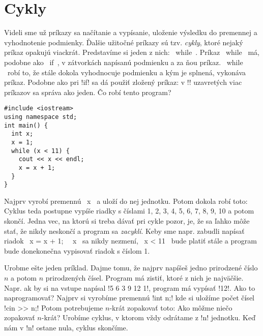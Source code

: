 \chapter{Cykly}

Videli sme už príkazy sa načítanie a vypísanie, uloženie výsledku do premennej
a vyhodnotenie podmienky. Ďalšie užitočné príkazy sú tzv. {\em cykly}, ktoré
nejaký príkaz opakujú viackrát. Predstavíme si jeden z nich: \prg~while~.
Príkaz \prg~while~ má, podobne ako \prg~if~, v zátvorkách napísanú
podmienku a za ňou príkaz. \prg ~while ~robí to, že stále dokola vyhodnocuje
podmienku a kým je splnená, vykonáva príkaz. Podobne ako pri \prg!if!
sa dá použiť zložený príkaz: v \prg!{}! uzavretých viac príkazov
sa správa ako jeden. Čo robí tento program?

\begin{lstlisting}
#include <iostream>
using namespace std;
int main() {
  int x;
  x = 1;
  while (x < 11) {
    cout << x << endl;
    x = x + 1;
  }
}
\end{lstlisting}

Najprv vyrobí premennú \prg~x~ a uloží do nej jednotku. Potom dokola robí toto:
 Cyklus teda postupne vypíše riadky s 
číslami 1, 2, 3, 4, 5, 6, 7, 8, 9, 10 a potom skončí. Jedna vec, na ktorú si treba dávať pri 
cykle pozor, je, že sa ľahko môže stať, že nikdy neskončí a program sa {\em zacyklí}.
Keby sme napr. zabudli napísať riadok \prg~x = x + 1;~ \prg~x~ sa nikdy nezmení,
\prg~x < 11~ bude platiť stále a program bude donekonečna vypisovať riadok s číslom 1.

Urobme ešte jeden príklad. Dajme tomu, že najprv napíšeš jedno
prirodzené číslo $n$ a potom $n$ prirodzených čísel. Program má zistiť,
ktoré z nich je najväčšie. Napr. ak by si na vstupe napísal \prg!5 6 3 9 12 1!, 
program má vypísať \prg!12!.  Ako to naprogramovať? Najprv si vyrobíme
premennú \prg!int n;! kde si uložíme počet čísel \prg!cin >> n;! Potom
potrebujeme $n$-krát zopakovať toto:  
  Ako
môžme niečo zopakovať $n$-krát? Urobíme cyklus, v ktorom vždy odrátame z
\prg!n!  jednotku.  Keď nám v \prg!n! ostane nula, cyklus skončíme.

